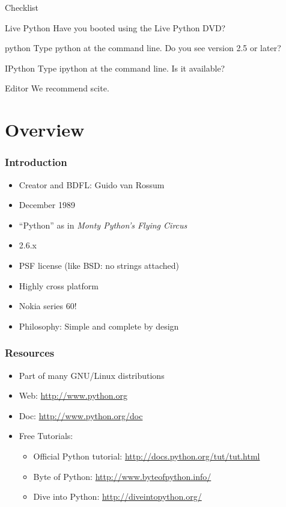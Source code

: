 \documentclass[14pt,compress]{beamer}
\begin{document}
\begin{frame}{Checklist}
        \begin {block}{Live Python}
          Have you booted using the Live Python DVD?
        \end {block}
	\begin{block}{python}
          Type python at the command line. Do you see version 2.5 or later?
        \end{block}
        \begin{block}{IPython}
          Type ipython at the command line. Is it available?
        \end{block}
        \begin{block}{Editor}
          We recommend scite. 
        \end{block}
\end{frame}

\section{Overview}
\begin{frame}
  \frametitle{Introduction}
  \begin{itemize}
  \item Creator and BDFL: Guido van Rossum
  \item December 1989
  \item ``Python'' as in \emph {Monty Python's Flying Circus}
  \item 2.6.x
  \item PSF license (like BSD: no strings attached)
  \item Highly cross platform
  \item Nokia series 60!
  \item \alert{Philosophy:} Simple and complete by design
  \end{itemize}
\end{frame}

\begin{frame}
  \frametitle{Resources}
  \begin{itemize}
  \item Part of many GNU/Linux distributions
  \item Web: \url{http://www.python.org}
  \item Doc: \url{http://www.python.org/doc}
  \item Free Tutorials:
    \begin{itemize}
    \item Official Python tutorial: \url{http://docs.python.org/tut/tut.html}
    \item Byte of Python: \url{http://www.byteofpython.info/}
    \item Dive into Python: \url{http://diveintopython.org/}
    \end{itemize}
  \end{itemize}
\end{frame}
\end{document}
